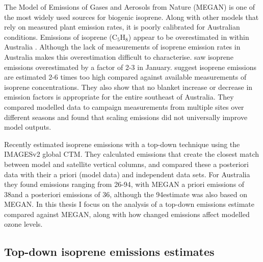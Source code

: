     The Model of Emissions of Gases and Aerosols from Nature (MEGAN) is one of the most widely used sources for biogenic isoprene.
    Along with other models that rely on measured plant emission rates, it is poorly calibrated for Australian conditions.
    Emissions of isoprene (C$_5$H$_8$) appear to be overestimated in within Australia \parencite{Sindelarova2014,Stavrakou2014,Emmerson2016}.
    Although the lack of measurements of isoprene emission rates in Australia makes this overestimation difficult to characterise.
    \textcite{Stavrakou2015} saw isoprene emissions overestimated by a factor of 2-3 in January.
    \textcite{Emmerson2016} suggest isoprene emissions are estimated 2-6 times too high compared against available measurements of isoprene concentrations.
    They also show that no blanket increase or decrease in emission factors is appropriate for the entire southeast of Australia.
    They compared modelled data to campaign measurements from multiple sites over different seasons and found that scaling emissions did not universally improve model outputs.
    

    Recently \textcite{Bauwens2016} estimated isoprene emissions with a top-down technique using the IMAGESv2 global CTM.
    They calculated emissions that create the closest match between model and satellite vertical columns, and compared these a posteriori data with their a priori (model data) and independent data sets.
    For Australia they found emissions ranging from 26-94\tgcpyr, with MEGAN a priori emissions of 38\tgcpyr and a posteriori emissions of 36\tgcpyr, although the 94\tgcpyr estimate was also based on MEGAN.
    In this thesis I focus on the analysis of a top-down emissions estimate compared against MEGAN, along with how changed emissions affect modelled ozone levels.
  
  \subsection{Top-down isoprene emissions estimates}
    \label{BioIsop:intro:top_down_estimates}
    
